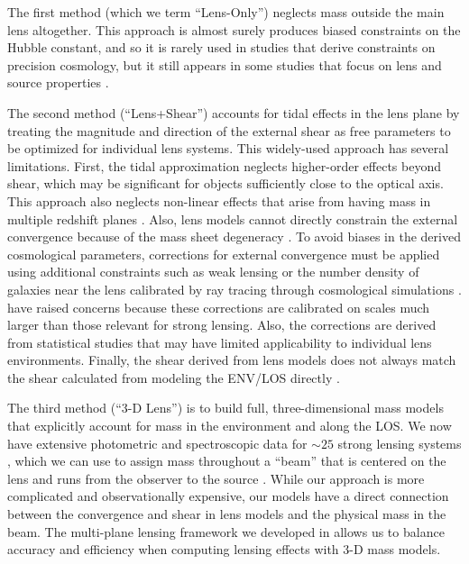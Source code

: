\documentclass{emulateapj}
\begin{document}
The first method (which we term ``Lens-Only'') neglects mass outside the main lens altogether.  This approach is almost surely produces biased constraints on the Hubble constant, and so it is rarely used in studies that derive constraints on precision cosmology, but it still appears in some studies that focus on lens and source properties \citep[e.g.][]{Calanog14, Hezaveh13}.

The second method (``Lens+Shear'') accounts for tidal effects in the lens plane by treating the magnitude and direction of the external shear as free parameters to be optimized for individual lens systems. This widely-used approach has several limitations. First, the tidal approximation neglects higher-order effects beyond shear, which may be significant for objects sufficiently close to the optical axis. This approach also neglects non-linear effects that arise from having mass in multiple redshift planes \citep[][]{McCully14,Jaroszynski12}. Also, lens models cannot directly constrain the external convergence because of the mass sheet degeneracy \citep{Falco85}.  To avoid biases in the derived cosmological parameters, corrections for external convergence must be applied using additional constraints such as weak lensing \citep{Nakajima09, Fadely10} or the number density of galaxies near the lens \citep[][Rusu et al.\ in preparation]{Suyu10, Suyu13, Collett13, Greene13} calibrated by ray tracing through cosmological simulations \citep[e.g.,][]{Hilbert09}. \citet{Schneider13} have raised concerns because these corrections are calibrated on scales much larger than those relevant for strong lensing.  Also, the corrections are derived from statistical studies that may have limited applicability to individual lens environments. Finally, the shear derived from lens models does not always match the shear calculated from modeling the ENV/LOS directly \citep{Wong11}.

The third method (``3-D Lens'') is to build full, three-dimensional mass models that explicitly account for mass in the environment and along the LOS.  We now have extensive photometric and spectroscopic data for $\sim25$ strong lensing systems \citep{Momcheva06,Williams08,Momcheva15}, which we can use to assign mass throughout a ``beam'' that is centered on the lens and runs from the observer to the source \citep[see][]{Wong11}.  While our approach is more complicated and observationally expensive, our models have a direct connection between the convergence and shear in lens models and the physical mass in the beam. The multi-plane lensing framework we developed in \citet[hereafter M14]{McCully14} allows us to balance accuracy and efficiency when computing lensing effects with 3-D mass models.
\end{document}
